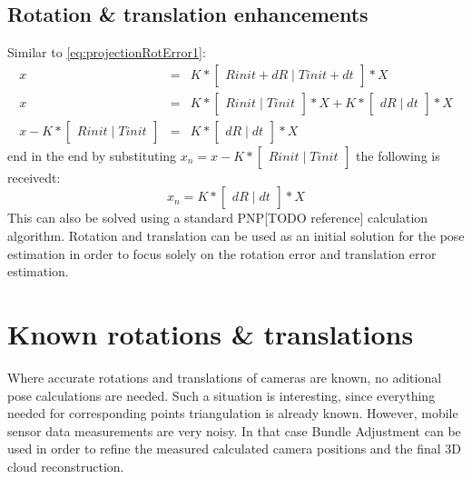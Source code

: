 \subsection{Rotation \& translation enhancements}
Similar to \ref{eq:projectionRotError1}:
\begin{equation} \label{eq:projectionRotError3}
\begin{array}{rcl}
 x & = & K * \begin{bmatrix}Rinit + dR\mid Tinit + dt\end{bmatrix} * X \\
 x & = & K * \begin{bmatrix}Rinit\mid Tinit\end{bmatrix} * X + K * \begin{bmatrix}dR\mid dt\end{bmatrix} * X \\
 x - K * \begin{bmatrix}Rinit\mid Tinit\end{bmatrix} & = & K * \begin{bmatrix}dR\mid dt\end{bmatrix} * X
\end{array}
\end{equation}
end in the end by substituting $x_{n} = x - K * \begin{bmatrix}Rinit\mid Tinit\end{bmatrix}$ the following is receivedt: 
\begin{equation} \label{eq:projectionRotError4}
x_{n} = K * \begin{bmatrix}dR\mid dt\end{bmatrix} * X
\end{equation}
This can also be solved using a standard PNP[TODO reference] calculation algorithm. Rotation and translation can be used as an initial solution for the pose estimation in order to focus solely on the rotation error and translation error estimation.
\section{Known rotations \& translations}
Where accurate rotations and translations of cameras are known, no aditional pose calculations are needed. Such a situation is interesting, since everything needed for corresponding points triangulation is already known. However, mobile sensor data  measurements are very noisy. In that case Bundle Adjustment can be used in order to refine the measured calculated camera positions and the final 3D cloud reconstruction.
